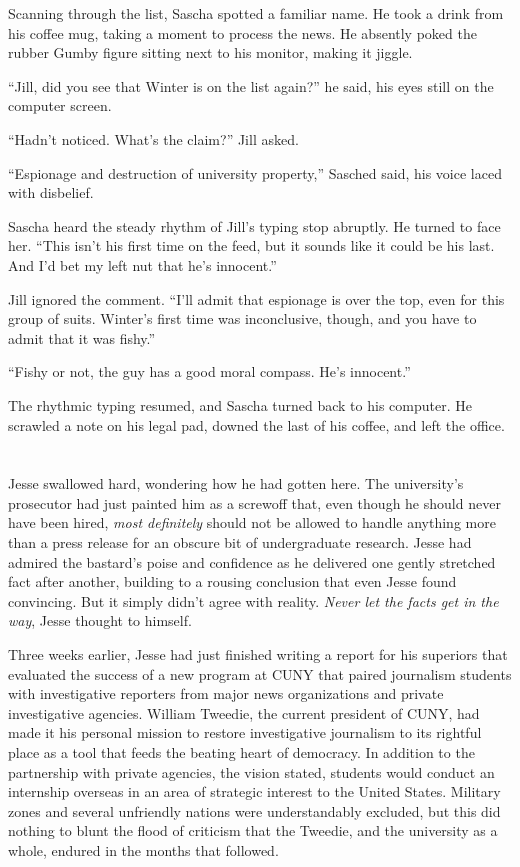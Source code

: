 \documentclass[12pt]{book}
\begin{document}
Scanning through the list, Sascha spotted a familiar name.  He took a drink from his coffee mug, taking a moment to process the news.  He absently poked the rubber Gumby figure sitting next to his monitor, making it jiggle.

``Jill, did you see that Winter is on the list again?'' he said, his eyes still on the computer screen.

``Hadn't noticed.  What's the claim?'' Jill asked.

``Espionage and destruction of university property,'' Sasched said, his voice laced with disbelief.

Sascha heard the steady rhythm of Jill's typing stop abruptly.  He turned to face her.  ``This isn't his first time on the feed, but it sounds like it could be his last.  And I'd bet my left nut that he's innocent.''

Jill ignored the comment.  ``I'll admit that espionage is over the top, even for this group of suits.  Winter's first time was inconclusive, though, and you have to admit that it was fishy.''

``Fishy or not, the guy has a good moral compass.  He's innocent.''

The rhythmic typing resumed, and Sascha turned back to his computer.  He scrawled a note on his legal pad, downed the last of his coffee, and left the office.

\chapter{}
								
Jesse swallowed hard, wondering how he had gotten here.  The university's prosecutor had just painted him as a screwoff that, even though he should never have been hired, \emph{most definitely} should not be allowed to handle anything more than a press release for an obscure bit of undergraduate research.  Jesse had admired the bastard's poise and confidence as he delivered one gently stretched fact after another, building to a rousing conclusion that even Jesse found convincing.  But it simply didn't agree with reality.  \emph{Never let the facts get in the way}, Jesse thought to himself.

Three weeks earlier, Jesse had just finished writing a report for his superiors that evaluated the success of a new program at CUNY that paired journalism students with investigative reporters from major news organizations and private investigative agencies.  William Tweedie, the current president of CUNY, had made it his personal mission to restore investigative journalism to its rightful place as a tool that feeds the beating heart of democracy.  In addition to the partnership with private agencies, the vision stated, students would conduct an internship overseas in an area of strategic interest to the United States.  Military zones and several unfriendly nations were understandably excluded, but this did nothing to blunt the flood of criticism that the Tweedie, and the university as a whole, endured in the months that followed.
\end{document}
